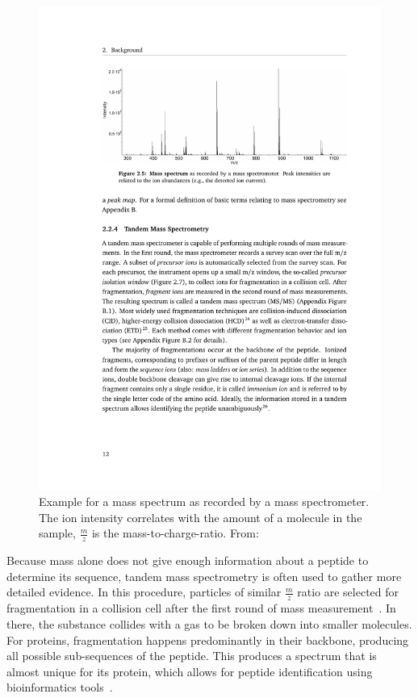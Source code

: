 	\begin{figure}
		\normalsize
		\centering
		\includegraphics[width = \textwidth, trim=3.9cm 20cm 2.5cm 3cm,clip]{figures/Grafik_Timo.pdf}
		\caption[Example for a mass spectrum]{Example for a mass spectrum as recorded by a mass spectrometer. The ion intensity correlates with the amount of a molecule in the sample, $\frac{m}{z}$ is the mass-to-charge-ratio. From:~\citet{Sachsenberg2017}}
		\label{fig:mass_spectrum}
	\end{figure}
	\renewcommand{\baselinestretch}{1}
	Because mass alone does not give enough information about a peptide to determine its sequence, tandem mass spectrometry is often used to gather more detailed evidence. In this procedure, particles of similar $\frac{m}{z}$ ratio are selected for fragmentation in a collision cell after the first round of mass measurement~\cite{Sachsenberg2017}. In there, the substance collides with a gas to be broken down into smaller molecules. For proteins, fragmentation happens predominantly in their backbone, producing all possible sub-sequences of the peptide. This produces a spectrum that is almost unique for its protein, which allows for peptide identification using bioinformatics tools~\cite{Angel2012}.\\
